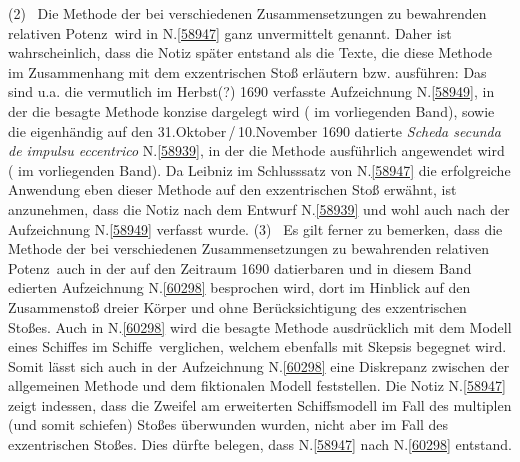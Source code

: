 \begin{ledgroup}
\pend%
\pstart%
(2)~%
Die \glqq Methode der bei verschiedenen Zusammensetzungen zu bewahrenden relativen Potenz\grqq\ wird in N.\;\ref{58947} ganz unvermittelt genannt.
Daher ist wahrscheinlich, dass die Notiz später entstand als die Texte, die diese Methode im Zusammenhang mit dem exzentrischen Stoß erläutern bzw. ausführen:
Das sind u.\;a.
die vermutlich im Herbst\;(?) 1690 verfasste Aufzeichnung N.\;\ref{58949}, in der die besagte Methode konzise dargelegt wird ( im vorliegenden Band),
sowie
die eigenhändig auf den 31.\;Oktober\,/\,10.\;November 1690 datierte \textit{Scheda secunda de impulsu eccentrico} N.\;\ref{58939}, in der die Methode ausführlich angewendet wird ( im vorliegenden Band).
Da Leibniz im Schlusssatz von N.\;\ref{58947} die erfolgreiche Anwendung eben dieser Methode auf den exzentrischen Stoß erwähnt, ist anzunehmen, dass die Notiz %
nach dem Entwurf N.\;\ref{58939} und wohl auch nach der Aufzeichnung N.\;\ref{58949} verfasst wurde.
\pend%
\pstart%
(3)~%
Es gilt ferner zu bemerken, dass die \glqq Methode der bei verschiedenen Zusammensetzungen zu bewahrenden relativen Potenz\grqq\ auch in der auf den Zeitraum 1690 datierbaren und in diesem Band edierten Aufzeichnung N.\;\ref{60298} besprochen wird, dort im Hinblick auf den Zusammenstoß dreier Körper und ohne Berücksichtigung des exzentrischen Stoßes. %
Auch in N.\;\ref{60298} wird die besagte Methode ausdrücklich mit dem Modell eines \glqq Schiffes im Schiffe\grqq\ verglichen, welchem ebenfalls mit Skepsis begegnet wird. %
Somit lässt sich auch in der Aufzeichnung N.\;\ref{60298} eine Diskrepanz zwischen der allgemeinen Methode und dem fiktionalen Modell feststellen.
Die Notiz N.\;\ref{58947} zeigt indessen, dass die Zweifel am erweiterten Schiffsmodell im Fall des multiplen (und somit schiefen) Stoßes überwunden wurden, nicht aber im Fall des exzentrischen Stoßes.
Dies dürfte belegen, dass N.\;\ref{58947} nach N.\;\ref{60298} entstand.
\pend%


\end{ledgroup}
